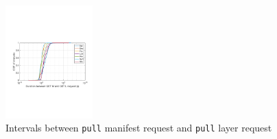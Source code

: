\begin{figure}[t]
	\centering
	\includegraphics[width=0.3\textwidth]{graphs/GML-intervals.pdf}
	\caption{Intervals between \texttt{pull} manifest request and \texttt{pull} layer request}
	\label{fig:intervals}
	
\end{figure}

